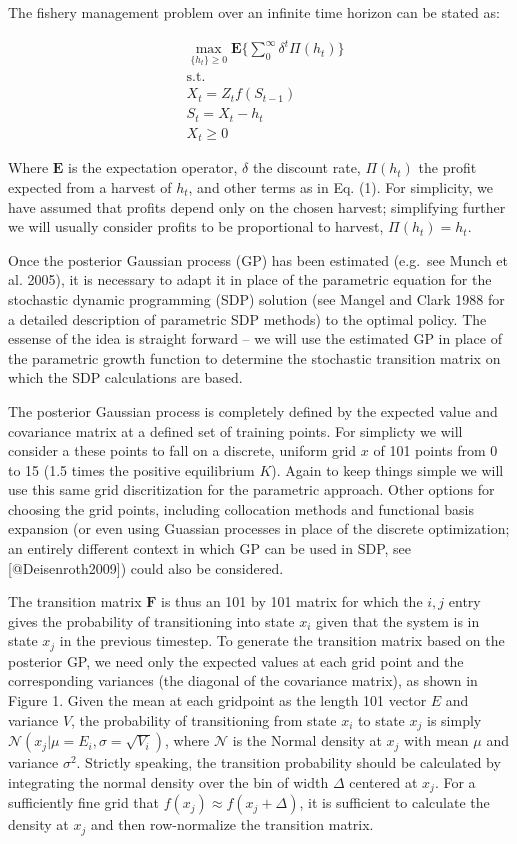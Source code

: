 \documentclass[author-year, review]{elsarticle} %
\begin{document}
The fishery management problem over an infinite time horizon can be
stated as:

\begin{align}
& \max_{ \{h_t\} \geq 0 } \mathbf{E} \lbrace \sum_0^\infty \delta^t \Pi(h_t) \rbrace \\
& \mathrm{s.t.}  \\
 & X_t = Z_t f\left(S_{t-1}\right) \\
 & S_t = X_t - h_t \\
 & X_t  \geq 0 
\end{align}

Where $\mathbf{E}$ is the expectation operator, $\delta$ the discount
rate, $\Pi(h_t)$ the profit expected from a harvest of $h_t$, and other
terms as in Eq. (1). For simplicity, we have assumed that profits depend
only on the chosen harvest; simplifying further we will usually consider
profits to be proportional to harvest, $\Pi(h_t) = h_t$.

Once the posterior Gaussian process (GP) has been estimated (e.g.~see
Munch et al. 2005), it is necessary to adapt it in place of the
parametric equation for the stochastic dynamic programming (SDP)
solution (see Mangel and Clark 1988 for a detailed description of
parametric SDP methods) to the optimal policy. The essense of the idea
is straight forward -- we will use the estimated GP in place of the
parametric growth function to determine the stochastic transition matrix
on which the SDP calculations are based.

The posterior Gaussian process is completely defined by the expected
value and covariance matrix at a defined set of training points. For
simplicty we will consider a these points to fall on a discrete, uniform
grid $x$ of 101 points from 0 to 15 (1.5 times the positive equilibrium
$K$). Again to keep things simple we will use this same grid
discritization for the parametric approach. Other options for choosing
the grid points, including collocation methods and functional basis
expansion (or even using Guassian processes in place of the discrete
optimization; an entirely different context in which GP can be used in
SDP, see {[}@Deisenroth2009{]}) could also be considered.

The transition matrix $\mathbf{F}$ is thus an 101 by 101 matrix for
which the ${i,j}$ entry gives the probability of transitioning into
state $x_i$ given that the system is in state $x_j$ in the previous
timestep. To generate the transition matrix based on the posterior GP,
we need only the expected values at each grid point and the
corresponding variances (the diagonal of the covariance matrix), as
shown in Figure 1. Given the mean at each gridpoint as the length 101
vector $E$ and variance $V$, the probability of transitioning from state
$x_i$ to state $x_j$ is simply
$\mathcal{N}\left(x_j \vert  \mu = E_i, \sigma = \sqrt{V_i}\right)$,
where $\mathcal{N}$ is the Normal density at $x_j$ with mean $\mu$ and
variance $\sigma^2$. Strictly speaking, the transition probability
should be calculated by integrating the normal density over the bin of
width $\Delta$ centered at $x_j$. For a sufficiently fine grid that
$f(x_j) \approx f(x_j + \Delta)$, it is sufficient to calculate the
density at $x_j$ and then row-normalize the transition matrix.
\end{document}
